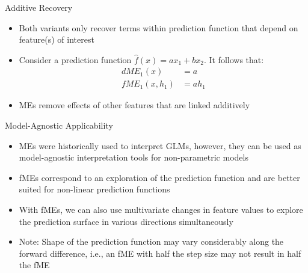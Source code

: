 \documentclass[11pt,compress,t,notes=noshow, aspectratio=169, xcolor=table]{beamer}
\begin{document}

\begin{frame}{Additive Recovery}

\begin{itemize}
\itemsep1em
\item Both variants only recover terms within prediction function that depend on feature(s) of interest
\item Consider a prediction function $\widehat{f}(x) = ax_1 + bx_2$. It follows that:
\begin{align*}
dME_1(x) &= a \\
fME_1(x, h_1) &= ah_1
\end{align*}
\item MEs remove effects of other features that are linked additively %
\end{itemize}

\end{frame}


\begin{frame}{Model-Agnostic Applicability}

\begin{itemize}
\itemsep1em
\item MEs were historically used to interpret GLMs, however, they can be used as model-agnostic interpretation tools for non-parametric models 
\item fMEs correspond to an exploration of the prediction function and are better suited for non-linear prediction functions
\item With fMEs, we can also use multivariate changes in feature values to explore the prediction surface in various directions simultaneously
\item Note: Shape of the prediction function may vary considerably along the forward difference, i.e., an fME with half the step size may not result in half the fME
\end{itemize}

\end{frame}
\end{document}
